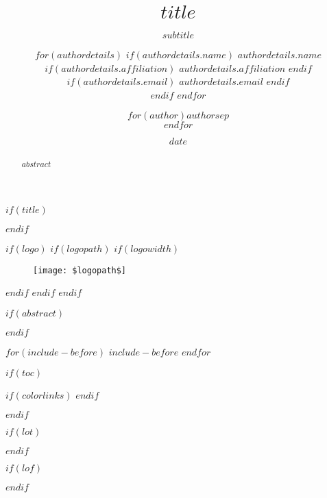 \documentclass[$if(fontsize)$$fontsize$,$endif$$if(lang)$$babel-lang$,$endif$$if(papersize)$$papersize$paper,$endif$$for(classoption)$$classoption$$sep$,$endfor$]{$documentclass$}
\title{$title$}
\title{}
\subtitle{$subtitle$}
\author{$for(authordetails)$
            $if(authordetails.name)$
                $authordetails.name$
                $if(authordetails.affiliation)$
                \authorsep $authordetails.affiliation$
                $endif$
                $if(authordetails.email)$
                \authorsep $authordetails.email$
                $endif$
                \\
            $endif$
           $endfor$}
\author{$for(author)$$author$$sep$ \\ $endfor$}
\author{}
\date{$date$}
\date{}
\begin{document}
$if(title)$
\maketitle
$endif$


$if(logo)$
$if(logopath)$
$if(logowidth)$
\begin{figure}[H]
\centering
\texttt{[image: \$logopath\$]}
\end{figure}

$endif$
$endif$
$endif$

$if(abstract)$
\begin{abstract}
$abstract$
\end{abstract}
$endif$


$for(include-before)$
$include-before$
$endfor$


$if(toc)$
{
$if(colorlinks)$
\hypersetup{linkcolor=$if(toccolor)$$toccolor$$else$black$endif$}
$endif$
\setcounter{tocdepth}{$toc-depth$}

        {
                {\renewcommand{\contentsname}{Sommaire}}} %
        { }
{}

\tableofcontents
}
$endif$


$if(lot)$
\listoftables
$endif$

$if(lof)$
\listoffigures
$endif$


\end{document}
